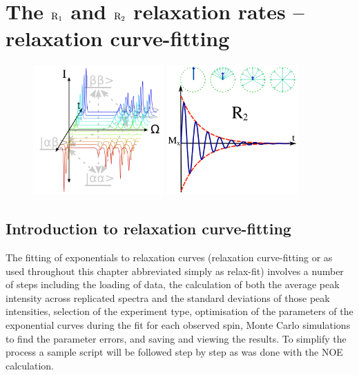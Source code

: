 
\chapter[Relaxation curve-fitting]{The $\mathrm{R}_1$ and $\mathrm{R}_2$ relaxation rates -- relaxation curve-fitting} \label{ch: relax-fit}


\begin{figure}[h]
  \includegraphics[width=5cm, bb=0 0 1701 1701]{graphics/analyses/r1_600x600} \hfill \includegraphics[width=5cm, bb=0 0 1701 1701]{graphics/analyses/r2_600x600}
\end{figure}



\section{Introduction to relaxation curve-fitting}

The fitting of exponentials to relaxation curves (relaxation curve-fitting or as used throughout this chapter abbreviated simply as relax-fit) involves a number of steps including the loading of data, the calculation of both the average peak intensity across replicated spectra and the standard deviations of those peak intensities, selection of the experiment type, optimisation of the parameters of the exponential curves during the fit for each observed spin, Monte Carlo simulations to find the parameter errors, and saving and viewing the results.
To simplify the process a sample script will be followed step by step as was done with the NOE calculation.



